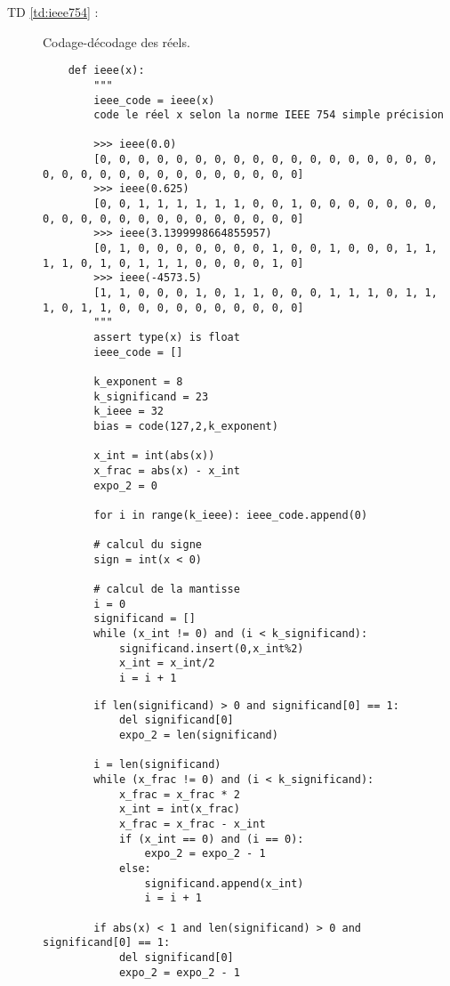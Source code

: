 \begin{description}
\item[TD \ref{td:ieee754} :] Codage-décodage des réels.

	\begin{py}{20cm}
	\begin{verbatim}
	def ieee(x):
	    """
	    ieee_code = ieee(x)
	    code le réel x selon la norme IEEE 754 simple précision

	    >>> ieee(0.0)
	    [0, 0, 0, 0, 0, 0, 0, 0, 0, 0, 0, 0, 0, 0, 0, 0, 0, 0, 0, 0, 0, 0, 0, 0, 0, 0, 0, 0, 0, 0, 0, 0]
	    >>> ieee(0.625)
	    [0, 0, 1, 1, 1, 1, 1, 1, 0, 0, 1, 0, 0, 0, 0, 0, 0, 0, 0, 0, 0, 0, 0, 0, 0, 0, 0, 0, 0, 0, 0, 0]
	    >>> ieee(3.1399998664855957)
	    [0, 1, 0, 0, 0, 0, 0, 0, 0, 1, 0, 0, 1, 0, 0, 0, 1, 1, 1, 1, 0, 1, 0, 1, 1, 1, 0, 0, 0, 0, 1, 0]
	    >>> ieee(-4573.5)
	    [1, 1, 0, 0, 0, 1, 0, 1, 1, 0, 0, 0, 1, 1, 1, 0, 1, 1, 1, 0, 1, 1, 0, 0, 0, 0, 0, 0, 0, 0, 0, 0]
	    """
	    assert type(x) is float
	    ieee_code = []

	    k_exponent = 8
	    k_significand = 23
	    k_ieee = 32
	    bias = code(127,2,k_exponent)

	    x_int = int(abs(x))
	    x_frac = abs(x) - x_int
	    expo_2 = 0

	    for i in range(k_ieee): ieee_code.append(0)

	    # calcul du signe
	    sign = int(x < 0)

	    # calcul de la mantisse
	    i = 0
	    significand = []
	    while (x_int != 0) and (i < k_significand):
        	significand.insert(0,x_int%2)
        	x_int = x_int/2
        	i = i + 1
	\end{verbatim}
	\end{py}
	
	\begin{py}{11cm}
	\begin{verbatim}
	    if len(significand) > 0 and significand[0] == 1:
        	del significand[0]
        	expo_2 = len(significand)

	    i = len(significand)
	    while (x_frac != 0) and (i < k_significand):
        	x_frac = x_frac * 2
        	x_int = int(x_frac)
        	x_frac = x_frac - x_int
        	if (x_int == 0) and (i == 0):
        	    expo_2 = expo_2 - 1
        	else:
        	    significand.append(x_int)
        	    i = i + 1

	    if abs(x) < 1 and len(significand) > 0 and significand[0] == 1:
        	del significand[0]
        	expo_2 = expo_2 - 1


\end{verbatim}
\end{py}
\end{description}
